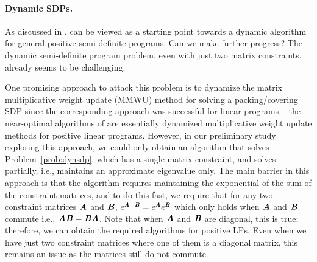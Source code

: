 \paragraph{Dynamic SDPs.}
As discussed in ,  can be viewed as a starting point towards a dynamic algorithm for general positive semi-definite programs. Can we make further progress? The dynamic semi-definite program problem, even with just two matrix constraints, already seems to be challenging. 

One promising approach to attack this problem is to dynamize the matrix multiplicative weight update (MMWU) method for solving a packing/covering SDP \cite{peng2012faster} since the corresponding approach was successful for linear programs -- the near-optimal algorithms of \cite{bhattacharya2023dynamic} are essentially dynamized multiplicative weight update methods for positive linear programs. However, in our preliminary study exploring this approach, we could only obtain an algorithm that solves Problem~\ref{prob:dynsdp}, which has a single matrix constraint, and  solves~ partially, i.e., maintains an approximate eigenvalue only. The main barrier in this approach is that the algorithm requires maintaining the exponential of the sum of the constraint matrices, and to do this fast, we require that for any two constraint matrices $\AA$ and $\BB$, $e^{\AA+\BB}= e^{\AA} e^{\BB}$ which only holds when $\AA$ and $\BB$ commute i.e., $\AA\BB = \BB\AA$. Note that when $\AA$ and $\BB$ are diagonal, this is true; therefore, we can obtain the required algorithms for positive LPs. Even when we have just two constraint matrices where one of them is a diagonal matrix, this remains an issue as the matrices still do not commute. 
